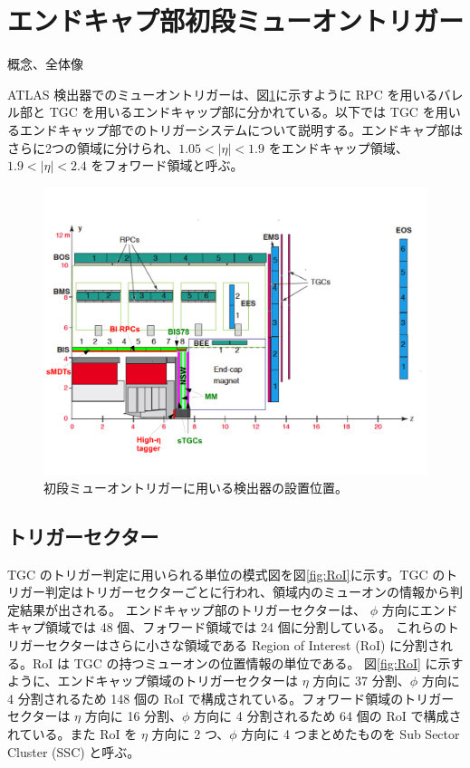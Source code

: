 \section{エンドキャプ部初段ミューオントリガー}
概念、全体像

ATLAS 検出器でのミューオントリガーは、図\ref{fig:muon}に示すように RPC を用いるバレル部と TGC を用いるエンドキャップ部に分かれている。以下では TGC を用いるエンドキャップ部でのトリガーシステムについて説明する。エンドキャプ部はさらに2つの領域に分けられ、$1.05 < |\eta| < 1.9$ をエンドキャップ領域、$1.9 < |\eta| < 2.4$ をフォワード領域と呼ぶ。

\begin{figure}[tb]
  \centering
  \includegraphics[clip, width=14cm]{fig/2/ch01_fig_03a.pdf}
  \caption{初段ミューオントリガーに用いる検出器の設置位置。}
  \label{fig:muon}
\end{figure}

\subsection{トリガーセクター}
TGC のトリガー判定に用いられる単位の模式図を図\ref{fig:RoI}に示す。TGC のトリガー判定はトリガーセクターごとに行われ、領域内のミューオンの情報から判定結果が出される。
エンドキャップ部のトリガーセクターは、 $\phi$ 方向にエンドキャプ領域では 48 個、フォワード領域では 24 個に分割している。
これらのトリガーセクターはさらに小さな領域である Region of Interest (RoI) に分割される。RoI は TGC の持つミューオンの位置情報の単位である。
図\ref{fig:RoI} に示すように、エンドキャップ領域のトリガーセクターは $\eta$ 方向に 37 分割、$\phi$ 方向に 4 分割されるため 148 個の RoI で構成されている。フォワード領域のトリガーセクターは $\eta$ 方向に 16 分割、$\phi$ 方向に 4 分割されるため 64 個の RoI で構成されている。また RoI を $\eta$ 方向に 2 つ、$\phi$ 方向に 4 つまとめたものを Sub Sector Cluster (SSC) と呼ぶ。


